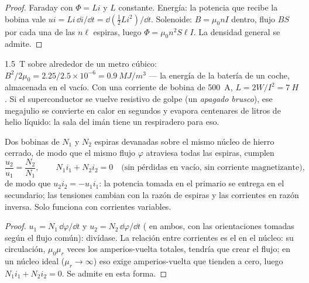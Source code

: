 \begin{proof}
Faraday con $\Phi = Li$ y $L$ constante. Energía: la potencia que recibe
la bobina vale $ui = Li\,\dd i/\dd t = \dd(\tfrac12Li^2)/\dd t$. Solenoide:
$B = \mu_0nI$ dentro, flujo $BS$ por cada una de las $n\ell$ espiras, luego $\Phi =
\mu_0n^2S\ell I$. La densidad general se admite.
\end{proof}

\begin{example}\label{ex:b1:induction:mri}
\qty{1.5}{T} sobre alrededor de un metro cúbico: $B^2/2\mu_0 = 2.25/2.5 \times 10^{-6} =
\qty{0.9}{MJ/m^3}$ --- la energía de la batería de un coche, almacenada
en el vacío. Con una corriente de bobina de \qty{500}{A},
$L = 2W/I^2 = \qty{7}{H}$. Si el superconductor se vuelve resistivo de
golpe (un \emph{apagado brusco}), ese megajulio se convierte en calor en
segundos y evapora centenares de litros de helio líquido: la sala del
imán tiene un respiradero para eso.
\end{example}

\begin{proposition}\label{prop:b1:induction:transformer}
Dos bobinas de $N_1$ y $N_2$ espiras devanadas sobre el mismo núcleo de
hierro cerrado, de modo que el mismo flujo $\varphi$ atraviesa todas las
espiras, cumplen
\[
\frac{u_2}{u_1} = \frac{N_2}{N_1} , \qquad N_1i_1 + N_2i_2 = 0 \quad\text{(sin pérdidas en vacío, sin corriente magnetizante)},
\]
de modo que $u_2i_2 = -u_1i_1$: la potencia tomada en el primario se
entrega en el secundario; las tensiones cambian con la razón de espiras y
las corrientes en razón inversa. Solo funciona con corrientes variables.
\end{proposition}

\begin{proof}
$u_1 = N_1\,\dd\varphi/\dd t$ y $u_2 = N_2\,\dd\varphi/\dd t$ ( en ambos, con las orientaciones tomadas según el flujo común):
divídase. La relación entre corrientes es el  en el
núcleo: su circulación, $\mu_0\mu_r$ veces los amperios-vuelta totales,
tendría que crear el flujo; en un núcleo ideal ($\mu_r \to \infty$) eso
exige amperios-vuelta que tienden a cero, luego $N_1i_1 + N_2i_2 = 0$. Se
admite en esta forma.
\end{proof}

